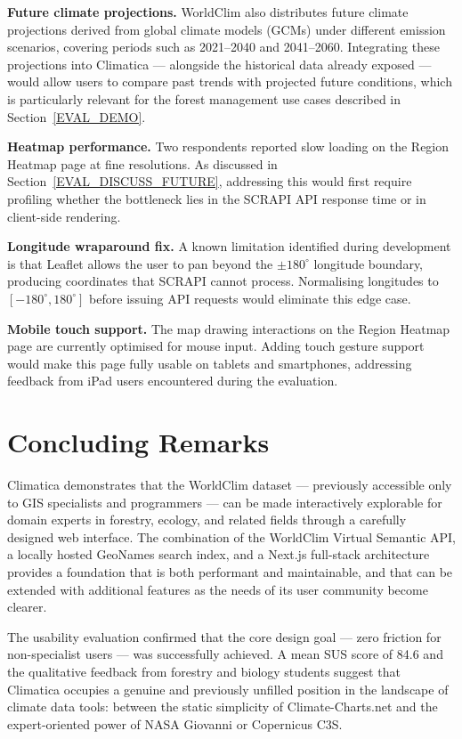 \textbf{Future climate projections.} WorldClim also distributes future climate
projections derived from global climate models (GCMs) under different emission
scenarios, covering periods such as 2021--2040 and 2041--2060. Integrating
these projections into Climatica --- alongside the historical data already
exposed --- would allow users to compare past trends with projected future
conditions, which is particularly relevant for the forest management use cases
described in Section~\ref{EVAL_DEMO}.

\textbf{Heatmap performance.} Two respondents reported slow loading on the
Region Heatmap page at fine resolutions. As discussed in
Section~\ref{EVAL_DISCUSS_FUTURE}, addressing this would first require
profiling whether the bottleneck lies in the SCRAPI API response time or in
client-side rendering.

\textbf{Longitude wraparound fix.} A known limitation identified during
development is that Leaflet allows the user to pan beyond the $\pm 180^{\circ}$
longitude boundary, producing coordinates that SCRAPI cannot process. Normalising
longitudes to $[-180^{\circ}, 180^{\circ}]$ before issuing API requests would
eliminate this edge case.

\textbf{Mobile touch support.} The map drawing interactions on the Region
Heatmap page are currently optimised for mouse input. Adding touch gesture
support would make this page fully usable on tablets and smartphones, addressing
feedback from iPad users encountered during the evaluation.

\section{Concluding Remarks}\label{CONC_REMARKS}

Climatica demonstrates that the WorldClim dataset --- previously accessible
only to GIS specialists and programmers --- can be made interactively explorable
for domain experts in forestry, ecology, and related fields through a carefully
designed web interface. The combination of the WorldClim Virtual Semantic API,
a locally hosted GeoNames search index, and a Next.js full-stack architecture
provides a foundation that is both performant and maintainable, and that can
be extended with additional features as the needs of its user community become
clearer.

The usability evaluation confirmed that the core design goal --- zero friction
for non-specialist users --- was successfully achieved. A mean SUS score of
84.6 and the qualitative feedback from forestry and biology students suggest
that Climatica occupies a genuine and previously unfilled position in the
landscape of climate data tools: between the static simplicity of
Climate-Charts.net and the expert-oriented power of NASA Giovanni or
Copernicus C3S.

